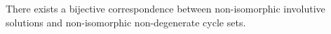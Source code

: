 
\begin{theorem}
	\label{thm:CS}
	There exists a bijective correspondence between non-isomorphic involutive solutions 
	and non-isomorphic non-degenerate cycle sets. 
\end{theorem}





